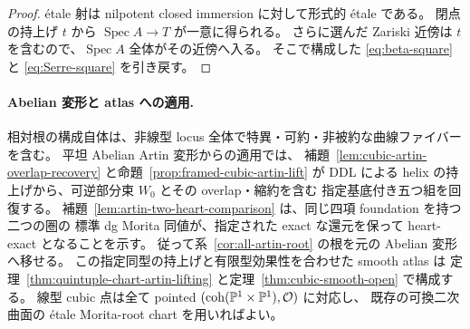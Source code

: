 \begin{proof}
étale 射は nilpotent closed immersion に対して形式的 étale である。
閉点の持上げ $t$ から $\operatorname{Spec} A\to T$ が一意に得られる。
さらに選んだ Zariski 近傍は $t$ を含むので、$\operatorname{Spec} A$ 全体がその近傍へ入る。
そこで構成した \eqref{eq:beta-square} と \eqref{eq:Serre-square} を引き戻す。
\end{proof}

\paragraph{Abelian 変形と atlas への適用.}
相対根の構成自体は、非線型 locus 全体で特異・可約・非被約な曲線ファイバーを含む。
平坦 Abelian Artin 変形からの適用では、
補題~\ref{lem:cubic-artin-overlap-recovery} と命題~\ref{prop:framed-cubic-artin-lift} が
DDL による helix の持上げから、可逆部分束 $W_0$ とその overlap・縮約を含む
指定基底付き五つ組を回復する。
補題~\ref{lem:artin-two-heart-comparison} は、同じ四項 foundation を持つ二つの圏の
標準 dg Morita 同値が、指定された exact な還元を保って heart-exact となることを示す。
従って系~\ref{cor:all-artin-root} の根を元の Abelian 変形へ移せる。
この指定同型の持上げと有限型効果性を合わせた smooth atlas は
定理~\ref{thm:quintuple-chart-artin-lifting} と定理~\ref{thm:cubic-smooth-open} で構成する。
線型 cubic 点は全て pointed $(\operatorname{coh}(\mathbb P^1\times\mathbb P^1),\mathcal O)$ に対応し、
既存の可換二次曲面の étale Morita-root chart を用いればよい。

